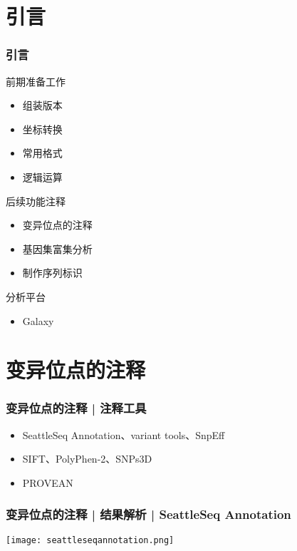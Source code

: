 \section{引言}
\begin{frame}
	\frametitle{引言}
	\begin{block}{前期准备工作}
		\begin{itemize}
			\item 组装版本
			\item 坐标转换
			\item 常用格式
			\item 逻辑运算
		\end{itemize}
	\end{block}
	\pause
	\begin{block}{后续功能注释}
		\begin{itemize}
			\item 变异位点的注释
			\item 基因集富集分析
			\item 制作序列标识
		\end{itemize}
	\end{block}
	\pause
	\begin{block}{分析平台}
		\begin{itemize}
			\item Galaxy
		\end{itemize}
	\end{block}
\end{frame}

\section{变异位点的注释}
\begin{frame}
	\frametitle{变异位点的注释 | 注释工具}
	\begin{itemize}
		\item SeattleSeq Annotation、variant tools、SnpEff 
		\item SIFT、PolyPhen-2、SNPs3D
		\item PROVEAN
	\end{itemize}
\end{frame}

\begin{frame}
	\frametitle{变异位点的注释 | 结果解析 | SeattleSeq Annotation}
		\begin{center}
			\texttt{[image: seattleseqannotation.png]}
		\end{center}
\end{frame}

